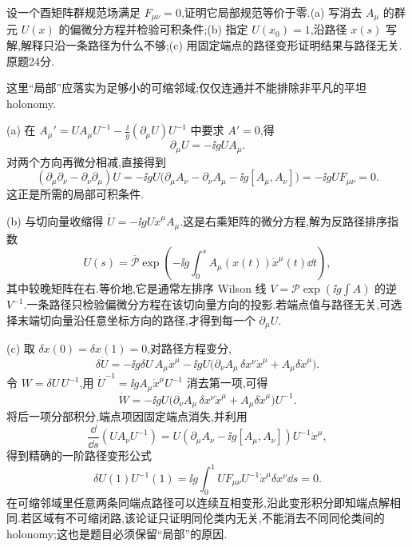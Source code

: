 \begin{exercise}
设一个酉矩阵群规范场满足 $F_{\mu\nu}=0$,证明它局部规范等价于零.(a) 写消去 $A_\mu$ 的群元 $U(x)$ 的偏微分方程并检验可积条件;(b) 指定 $U(x_0)=1$,沿路径 $x(s)$ 写解,解释只沿一条路径为什么不够;(c) 用固定端点的路径变形证明结果与路径无关.原题24分.
\end{exercise}
\begin{solution}
这里“局部”应落实为足够小的可缩邻域;仅仅连通并不能排除非平凡的平坦 holonomy.

(a) 在 $A_\mu'=UA_\mu U^{-1}-\frac{\ii}{g}(\partial_\mu U)U^{-1}$ 中要求 $A'=0$,得
\[
\partial_\mu U=-\ii gUA_\mu.
\]
对两个方向再微分相减,直接得到
\[
(\partial_\mu\partial_\nu-\partial_\nu\partial_\mu)U
=-\ii gU\bigl(\partial_\mu A_\nu-\partial_\nu A_\mu-\ii g[A_\mu,A_\nu]\bigr)
=-\ii gUF_{\mu\nu}=0.
\]
这正是所需的局部可积条件.

(b) 与切向量收缩得 $\dot U=-\ii gU\dot x^\mu A_\mu$.这是右乘矩阵的微分方程,解为反路径排序指数
\[
U(s)=\overline{\mathcal P}\exp\!\left(-\ii g\int_0^s A_\mu(x(t))\dot x^\mu(t)\dd t\right),
\]
其中较晚矩阵在右.等价地,它是通常左排序 Wilson 线 $V=\mathcal P\exp(\ii g\int A)$ 的逆 $V^{-1}$.一条路径只检验偏微分方程在该切向量方向的投影.若端点值与路径无关,可选择末端切向量沿任意坐标方向的路径,才得到每一个 $\partial_\mu U$.

(c) 取 $\delta x(0)=\delta x(1)=0$,对路径方程变分,
\[
\delta\dot U=-\ii g\delta U\,A_\mu\dot x^\mu
-\ii gU\bigl(\partial_\nu A_\mu\,\delta x^\nu\dot x^\mu+A_\mu\delta\dot x^\mu\bigr).
\]
令 $W=\delta U\,U^{-1}$,用 $\dot U^{-1}=\ii gA_\mu\dot x^\mu U^{-1}$ 消去第一项,可得
\[
\dot W=-\ii gU\bigl(\partial_\nu A_\mu\,\delta x^\nu\dot x^\mu
+A_\mu\delta\dot x^\mu\bigr)U^{-1}.
\]
将后一项分部积分,端点项因固定端点消失,并利用
\[
\frac{\dd}{\dd s}(UA_\nu U^{-1})
=U(\partial_\mu A_\nu-\ii g[A_\mu,A_\nu])U^{-1}\dot x^\mu,
\]
得到精确的一阶路径变形公式
\[
\delta U(1)U^{-1}(1)
=\ii g\int_0^1UF_{\mu\nu}U^{-1}\dot x^\mu\delta x^\nu\dd s=0.
\]
在可缩邻域里任意两条同端点路径可以连续互相变形,沿此变形积分即知端点解相同.若区域有不可缩闭路,该论证只证明同伦类内无关,不能消去不同同伦类间的 holonomy;这也是题目必须保留“局部”的原因.
\end{solution}


